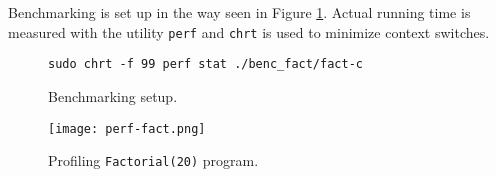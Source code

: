 Benchmarking is set up in the way seen in Figure \ref{bench-setup}. Actual running time is measured with the utility \texttt{perf} and \texttt{chrt} is used to minimize context switches.

\begin{figure}[h]
\begin{verbatim}
sudo chrt -f 99 perf stat ./benc_fact/fact-c 
\end{verbatim}
\caption{Benchmarking setup.}
\label{bench-setup}
\end{figure}


\begin{figure}[h]
\centering
\texttt{[image: perf-fact.png]}
\caption{Profiling \texttt{Factorial(20)} program.}
\label{perf-fact}
\end{figure}
